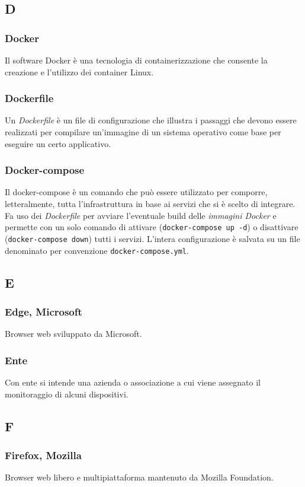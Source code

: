 \subsection{D}
\subsubsection*{Docker}  Il software Docker è una tecnologia di containerizzazione che consente la creazione e l'utilizzo dei container Linux.
\subsubsection*{Dockerfile}  Un \textit{Dockerfile} è un file di configurazione che illustra i passaggi che devono essere realizzati per compilare un'immagine di un sistema operativo come base per eseguire un certo applicativo.
\subsubsection*{Docker-compose}  Il docker-compose è un comando che può essere utilizzato per comporre, letteralmente, tutta l'infrastruttura in base ai servizi che si è scelto di integrare. Fa uso dei \textit{Dockerfile} per avviare l'eventuale build delle \textit{immagini Docker} e permette con un solo comando di attivare (\verb!docker-compose up -d!) o disattivare (\verb!docker-compose down!) tutti i servizi. L'intera configurazione è salvata su un file denominato per convenzione \verb!docker-compose.yml!.
\subsection{E}
\subsubsection*{Edge, Microsoft}
Browser web sviluppato da Microsoft.
\subsubsection*{Ente}
Con ente si intende una azienda o associazione a cui viene assegnato il monitoraggio di alcuni dispositivi.
\subsection{F}
\subsubsection*{Firefox, Mozilla}
Browser web libero e multipiattaforma mantenuto da Mozilla Foundation.
